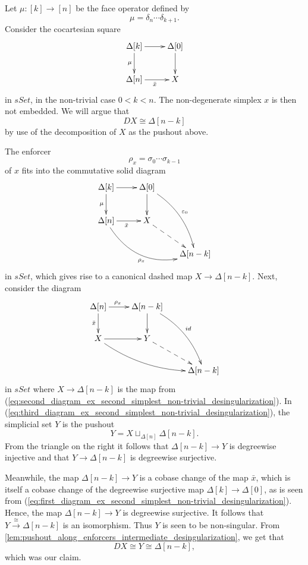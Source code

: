 \begin{example}\label{ex:second_simplest_non-trivial_desingularization}
Let $\mu :[k]\to [n]$ be the face operator defined by
\[\mu =\delta _n\cdots \delta _{k+1}.\]
Consider the cocartesian square
\begin{equation}
\label{eq:first_diagram_ex_second_simplest_non-trivial_desingularization}
\begin{gathered}
\xymatrix{
\Delta [k] \ar[d]_{\mu } \ar[r] & \Delta [0] \ar[d] \\
\Delta [n] \ar[r]_{\bar{x} } & X
}
\end{gathered}
\end{equation}
in $sSet$, in the non-trivial case $0<k<n$. The non-degenerate simplex $x$ is then not embedded. We will argue that
\[DX\cong \Delta [n-k]\]
by use of the decomposition of $X$ as the pushout above.

The enforcer
\[\rho _x=\sigma _0\cdots \sigma _{k-1}\]
of $x$ fits into the commutative solid diagram
\begin{equation}
\label{eq:second_diagram_ex_second_simplest_non-trivial_desingularization}
\begin{gathered}
\xymatrix{
\Delta [k] \ar[d]_{\mu } \ar[r] & \Delta [0] \ar[d] \ar@/^1pc/[ddr]^{\varepsilon _0} \\
\Delta [n] \ar[r]_{\bar{x} } \ar@/_2pc/[drr]_{\rho _x} & X \ar@{-->}[dr] \\
&& \Delta [n-k]
}
\end{gathered}
\end{equation}
in $sSet$, which gives rise to a canonical dashed map $X\to \Delta [n-k]$. Next, consider the diagram
\begin{equation}
\label{eq:third_diagram_ex_second_simplest_non-trivial_desingularization}
\begin{gathered}
\xymatrix{
\Delta [n] \ar[d]_{\bar{x} } \ar[r]^(.40){\rho _x} & \Delta [n-k] \ar[d] \ar@/^1pc/[ddr]^{id} \\
X \ar@/_1pc/[drr] \ar[r] & Y \ar@{-->}[dr] \\
&& \Delta [n-k]
}
\end{gathered}
\end{equation}
in $sSet$ where $X\to \Delta [n-k]$ is the map from (\ref{eq:second_diagram_ex_second_simplest_non-trivial_desingularization}). In (\ref{eq:third_diagram_ex_second_simplest_non-trivial_desingularization}), the simplicial set $Y$ is the pushout
\[Y=X\sqcup _{\Delta [n]}\Delta [n-k].\]
From the triangle on the right it follows that $\Delta [n-k]\to Y$ is degreewise injective and that $Y\to \Delta [n-k]$ is degreewise surjective.

Meanwhile, the map $\Delta [n-k]\to Y$ is a cobase change of the map $\bar{x}$, which is itself a cobase change of the degreewise surjective map $\Delta [k]\to \Delta [0]$, as is seen from (\ref{eq:first_diagram_ex_second_simplest_non-trivial_desingularization}). Hence, the map $\Delta [n-k]\to Y$ is degreewise surjective. It follows that $Y\xrightarrow{\cong } \Delta [n-k]$ is an isomorphism. Thus $Y$ is seen to be non-singular. From \cref{lem:pushout_along_enforcers_intermediate_desingularization}, we get that
\[DX\cong Y\cong \Delta [n-k],\]
which was our claim.
\end{example}

